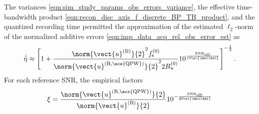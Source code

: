 The variances
\eqref{eqn:sim_study_params_obs_errors_variance},
the effective time-bandwidth product
\eqref{eqn:recon_disc_axis_f_discrete_BP_TB_product}, and
the quantized recording time permitted
the approximation of
the estimated $\ell_{2}$-norm of
the normalized additive errors
\eqref{eqn:imp_data_acq_rel_obs_error_est} as
\begin{equation*}
  \hat{ \bar{\eta} }
  \approx
  \left[
    1
    +
    \frac{
      \norm{ \vect{u}^{(\text{B})} }{2}^{2}
      f_{\text{s}}^{(0)}
    }{
      \norm{ \vect{u}^{(\text{B}, \text{\acs{QPW}})} }{2}^{2}
      2 B_{ u }^{(0)}
    }
    10^{ \frac{ \text{SNR}_{\text{dB}} }{ 10 \si{\deci\bel} } }
  \right]^{ - \frac{1}{2} }.
\end{equation*}
For
each reference \ac{SNR},
the empirical factors
\begin{equation}
  \xi
  =
  \frac{
    \norm{ \vect{u}^{(\text{B}, \text{\acs{QPW}})} }{2}
  }{
    \norm{ \vect{u}^{(\text{B})} }{2}
  }
  10^{ - \frac{ \text{SNR}_{\text{dB}} }{ 20 \si{\deci\bel} } }
 \label{eqn:sim_study_params_reg_factor_threshold}
\end{equation}
